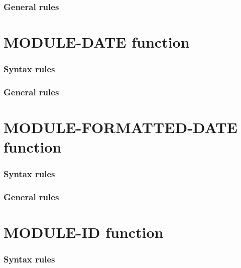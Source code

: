 \subsubsection{General rules}

\section{MODULE-DATE function}

\begin{syntax}[\gnucobolcolour]
   
\end{syntax}

\subsubsection{Syntax rules}

\subsubsection{General rules}

\section{MODULE-FORMATTED-DATE function}

\begin{syntax}[\gnucobolcolour]
   
\end{syntax}

\subsubsection{Syntax rules}

\subsubsection{General rules}

\section{MODULE-ID function}

\begin{syntax}[\gnucobolcolour]
   
\end{syntax}

\subsubsection{Syntax rules}

